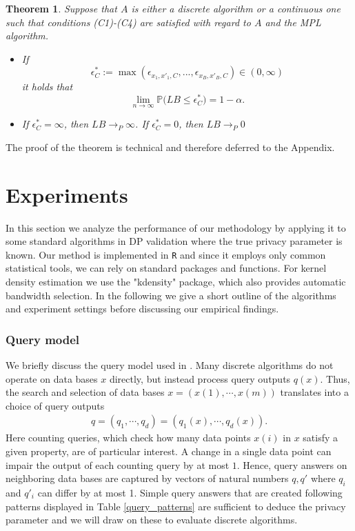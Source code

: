 \documentclass[conference]{IEEEtran}
\newtheorem{theorem}{Theorem}
\begin{document}
\begin{theorem} \label{theorem_3} 
Suppose that $A$ is either a discrete algorithm or a continuous one such that conditions (C1)-(C4) are satisfied with regard to $A$ and the MPL algorithm. 
\begin{itemize}
    \item[i)] If 
    $$
    \epsilon_{C}^* := \max(\epsilon_{x_1,x'_1,C},...,\epsilon_{x_B,x'_B,C}) \in (0, \infty)
    $$
    it holds that
\begin{equation} \label{Eq_level}
    \lim_{n \to \infty} \mathbb{P}\Big( LB \le \epsilon_{C}^* \Big) = 1-\alpha.
\end{equation}
    \item[ii)] If $ \epsilon_{C}^* = \infty$, then $LB \to_P \infty$.  If $ \epsilon_{C}^* = 0$, then $LB \to_P 0$
\end{itemize}
\end{theorem}
The proof of the theorem is technical and therefore deferred to the Appendix.


\section{Experiments} \label{Sec_5} 

In this section we analyze the performance of our methodology by applying it to some standard algorithms 
in DP validation where the true privacy parameter is known. 
Our method is implemented in \texttt{R} and since it employs only common statistical tools, we can rely on standard packages and functions.
For kernel density estimation we use the "kdensity" package, which also provides automatic bandwidth selection. 
In the following we give a short outline of the algorithms and experiment settings before discussing our empirical findings.



\subsubsection*{\textbf{Query model}}
We briefly discuss the query model used in \cite{StatDP}. Many discrete algorithms do not operate on data bases $x$ directly, but instead process query outputs $q(x)$. Thus, the search and selection of data bases $x = (x(1), \cdots, x(m))$ translates into a choice of query outputs 
\begin{align*}
    q = (q_1, \cdots, q_d) = (q_1(x), \cdots, q_d(x)).
\end{align*}
Here counting queries, which check how many data points $x(i)$ in $x$ satisfy a given property, are of particular interest. A change in a single data point can impair the output of each counting query by at most $1$. Hence, query answers on neighboring data bases are captured by vectors of natural numbers $q,q'$ where $q_i$ and $q'_i$ can differ by at most 1. Simple query answers that are created following patterns displayed in Table \ref{query_patterns} are sufficient to deduce the privacy parameter \cite{StatDP} and we will draw on these to evaluate discrete algorithms. 
\end{document}
